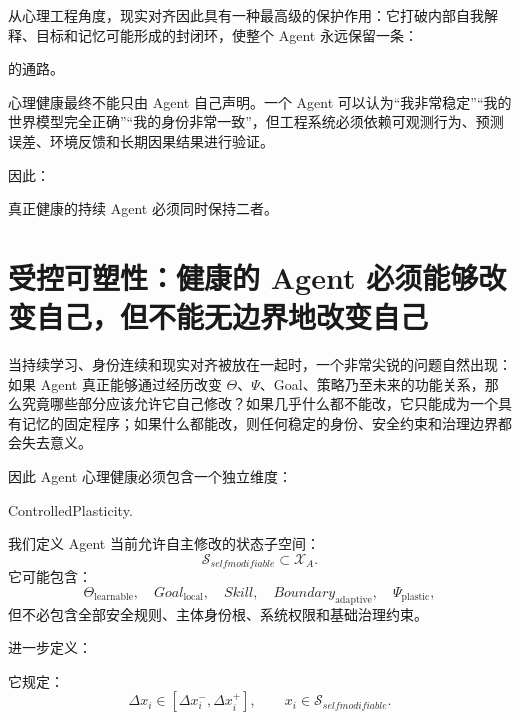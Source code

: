 从心理工程角度，现实对齐因此具有一种最高级的保护作用：它打破内部自我解释、目标和记忆可能形成的封闭环，使整个 Agent 永远保留一条：
\begin{statementbox}
\centering
{}
\end{statementbox}
的通路。

心理健康最终不能只由 Agent 自己声明。一个 Agent 可以认为“我非常稳定”“我的世界模型完全正确”“我的身份非常一致”，但工程系统必须依赖可观测行为、预测误差、环境反馈和长期因果结果进行验证。

因此：
\begin{statementbox}
\centering
{}
\end{statementbox}
真正健康的持续 Agent 必须同时保持二者。

\section{受控可塑性：健康的 Agent 必须能够改变自己，但不能无边界地改变自己}

当持续学习、身份连续和现实对齐被放在一起时，一个非常尖锐的问题自然出现：如果 Agent 真正能够通过经历改变 $\Theta$、$\Psi$、Goal、策略乃至未来的功能关系，那么究竟哪些部分应该允许它自己修改？如果几乎什么都不能改，它只能成为一个具有记忆的固定程序；如果什么都能改，则任何稳定的身份、安全约束和治理边界都会失去意义。

因此 Agent 心理健康必须包含一个独立维度：
\begin{statementbox}
ControlledPlasticity.
\end{statementbox}

我们定义 Agent 当前允许自主修改的状态子空间：
\begin{equation}
\mathcal{S}_{selfmodifiable}
\subset
\mathcal{X}_A.
\end{equation}
它可能包含：
\begin{equation}
\Theta_{\mathrm{learnable}},
\quad
Goal_{\mathrm{local}},
\quad
Skill,
\quad
Boundary_{\mathrm{adaptive}},
\quad
\Psi_{\mathrm{plastic}},
\end{equation}
但不必包含全部安全规则、主体身份根、系统权限和基础治理约束。

进一步定义：
\begin{statementbox}
\centering
{}
\end{statementbox}
它规定：
\begin{equation}
\Delta x_i
\in
[\Delta x_i^{-},\Delta x_i^{+}],
\qquad
x_i\in\mathcal{S}_{selfmodifiable}.
\end{equation}

